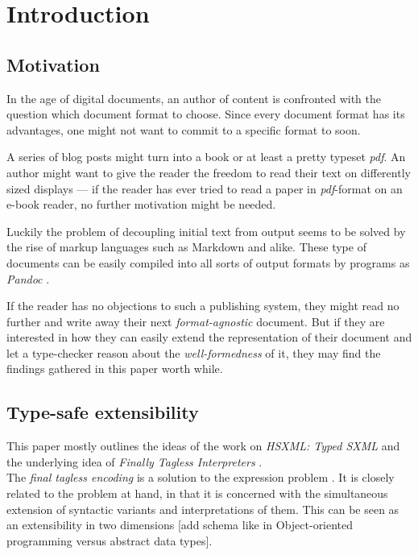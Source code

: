 \section{Introduction}
\label{sec:orgc140eeb}

\subsection{Motivation}

In the age of digital documents, an author of content is confronted with the
question which document format to choose. Since every document format has its
advantages, one might not want to commit to a specific format to soon.

A series of blog posts might turn into a book or at least a pretty typeset
\emph{pdf}. An author might want to give the reader the freedom to read
their text on differently sized displays — if the reader has ever tried to read
a paper in \emph{pdf}-format on an e-book reader, no further motivation might
be needed.

Luckily the problem of decoupling initial text from output seems to be solved by
the rise of markup languages such as Markdown and alike. These type of documents
can be easily compiled into all sorts of output formats by programs as
\emph{Pandoc} \cite{pandoc}.

If the reader has no objections to such a publishing system, they might read no
further and write away their next \emph{format-agnostic} document. But if they
are interested in how they can easily extend the representation of their
document and let a type-checker reason about the \emph{well-formedness} of it,
they may find the findings gathered in this paper worth while.

\subsection{Type-safe extensibility}

This paper mostly outlines the ideas of the work on \emph{HSXML: Typed SXML}
\cite{hsxml} and the underlying idea of \emph{Finally Tagless Interpreters}
\cite{finally-tagless, finally-tagless-tut}.\\
The \emph{final tagless encoding} is a solution to the expression problem
\cite{expression-problem}. It is closely related to the problem at hand, in that
it is concerned with the simultaneous extension of syntactic variants and
interpretations of them. This can be seen as an extensibility in two dimensions
[add schema like in Object-oriented programming versus abstract data types].

